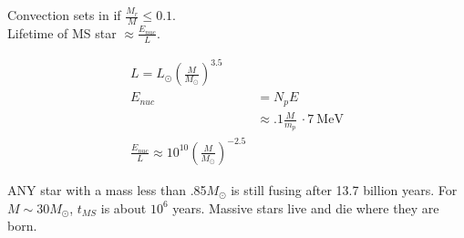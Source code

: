 \documentclass[10pt,a4paper]{article}
\begin{document}
Convection sets in if $\frac{M_r}{M} \leq 0.1$. \\

Lifetime of MS star $\approx \frac{E_{nuc}}{L}$. 

\begin{align}
L = L_\odot \left( \frac{M}{M_\odot} \right)^{3.5}\\
E_{nuc} &= N_p E\\
&  \approx  .1 \frac{M}{m_p}~\cdot 7 ~\text{MeV}\\
\frac{E_{nuc}}{L} \approx 10^{10} \left( \frac{M}{M_\odot} \right)^{-2.5}
\end{align}

ANY star with a mass less than .85$M_\odot$ is still fusing after 13.7 billion years. For $M \sim 30 M_\odot$, $t_{MS}$ is about $10^6$ years. Massive stars live and die where they are born. 
\end{document}
